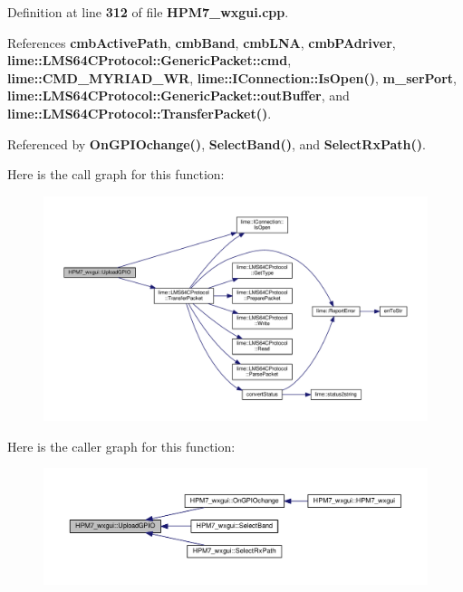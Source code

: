 Definition at line {\bf 312} of file {\bf H\+P\+M7\+\_\+wxgui.\+cpp}.



References {\bf cmb\+Active\+Path}, {\bf cmb\+Band}, {\bf cmb\+L\+NA}, {\bf cmb\+P\+Adriver}, {\bf lime\+::\+L\+M\+S64\+C\+Protocol\+::\+Generic\+Packet\+::cmd}, {\bf lime\+::\+C\+M\+D\+\_\+\+M\+Y\+R\+I\+A\+D\+\_\+\+WR}, {\bf lime\+::\+I\+Connection\+::\+Is\+Open()}, {\bf m\+\_\+ser\+Port}, {\bf lime\+::\+L\+M\+S64\+C\+Protocol\+::\+Generic\+Packet\+::out\+Buffer}, and {\bf lime\+::\+L\+M\+S64\+C\+Protocol\+::\+Transfer\+Packet()}.



Referenced by {\bf On\+G\+P\+I\+Ochange()}, {\bf Select\+Band()}, and {\bf Select\+Rx\+Path()}.



Here is the call graph for this function\+:
\nopagebreak
\begin{figure}[H]
\begin{center}
\leavevmode
\includegraphics[width=350pt]{de/dd7/classHPM7__wxgui_a4d71c05e7839a7006e397df82c4abfaa_cgraph}
\end{center}
\end{figure}




Here is the caller graph for this function\+:
\nopagebreak
\begin{figure}[H]
\begin{center}
\leavevmode
\includegraphics[width=350pt]{de/dd7/classHPM7__wxgui_a4d71c05e7839a7006e397df82c4abfaa_icgraph}
\end{center}
\end{figure}




